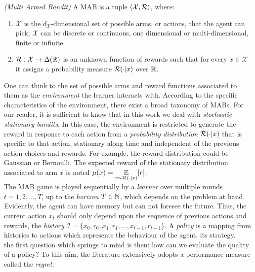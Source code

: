 \begin{definition} \emph{(Multi Armed Bandit)}
A \gls{MAB} is a tuple $\langle\mathcal{X}, \mathcal{R}\rangle$, where:
\begin{enumerate}
\item $\mathcal{X}$ is the $d_{\mathcal{X}}$-dimensional set of possible arms, or actions, that the agent can pick; $\mathcal{X}$ can be discrete or continuous, one dimensional or multi-dimensional, finite or infinite.
\item $\mathcal{R}:\mathcal{X}\to\Delta(\mathbb{R})$ is an unknown function of rewards such that for every $x\in\mathcal{X}$ it assigns a probability measure $\mathcal{R}(\cdot|x)$ over $\mathbb{R}$. 
\end{enumerate}
\end{definition}

One can think to the set of possible arms and reward functions associated to them as the \emph{environment} the learner interacts with. According to the specific characteristics of the environment, there exist a broad taxonomy of \gls{MAB}s. For our reader, it is sufficient to know that in this work we deal with \emph{stochastic stationary bandits}. In this case, the environment is restricted to generate the reward in response to each action from a \emph{probability distribution} $\mathcal{R}(\cdot|x)$ that is specific to that action, stationary along time and independent of the previous action choices and rewards. For example, the reward distribution could be Gaussian or Bernoulli. The expected reward of the stationary distribution associated to arm $x$ is noted $\mu(x) = \underset{r\sim\mathcal{R}(\cdot|x)}{\mathbb{E}}[r]$. \\
The \gls{MAB} game is played sequentially by a \emph{learner} over multiple rounds $t=1, 2, \dots, T$, up to the \emph{horizon} $T\in\mathbb{N}$, which depends on the problem at hand. Evidently, the agent can have memory but can not foresee the future. Thus, the current action $x_t$ should only depend upon the sequence of previous actions and rewards, the \emph{history} $\mathcal{I} = \{x_0, r_0, x_1, r_1, \dots, x_{t-1}, r_{t-1}\}$. A \emph{policy} is a mapping from histories to actions which represents the behaviour of the agent, its strategy. \\
the first question which springs to mind is then: how can we evaluate the quality of a policy? To this aim, the literature extensively adopts a performance measure called the \emph{regret};

